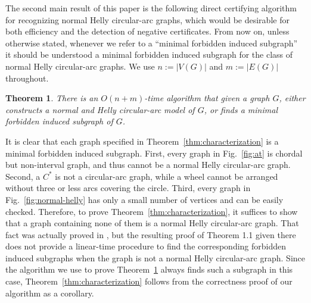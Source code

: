 \documentclass[10pt]{article}
\newtheorem{theorem}{Theorem}[section]
\newcommand{\nhcag}{normal Helly circular-arc graph}
\begin{document}
The second main result of this paper is the following direct
certifying algorithm for recognizing \nhcag s, which would be
desirable for both efficiency and the detection of negative
certificates.  From now on, unless otherwise stated, whenever we refer
to a ``minimal forbidden induced subgraph'' it should be understood a
minimal forbidden induced subgraph for the class of normal Helly
circular-arc graphs.  We use $n := |V(G)|$ and $m := |E(G)|$
throughout.
\begin{theorem}\label{thm:certifying-algorithm}
  There is an $O(n+m)$-time algorithm that given a graph $G$, either
  constructs a normal and Helly circular-arc model of $G$, or finds a
  minimal forbidden induced subgraph of $G$.
\end{theorem}

It is clear that each graph specified in
Theorem~\ref{thm:characterization} is a minimal forbidden induced
subgraph.  First, every graph in Fig.~\ref{fig:at} is chordal but
non-interval graph, and thus cannot be a \nhcag.  Second, a $C^*$ is
not a circular-arc graph, while a wheel cannot be arranged without
three or less arcs covering the circle.  Third, every graph in
Fig.~\ref{fig:normal-helly} has only a small number of vertices and
can be easily checked.  Therefore, to prove
Theorem~\ref{thm:characterization}, it suffices to show that a graph
containing none of them is a \nhcag.  That fact was actually proved in
\cite{grippo-12-cag-without-dominating-triple}, but the resulting
proof of Theorem 1.1 given there does not provide a linear-time
procedure to find the corresponding forbidden induced subgraphs when
the graph is not a normal Helly circular-arc graph.  Since the
algorithm we use to prove Theorem~\ref{thm:certifying-algorithm}
always finds such a subgraph in this case,
Theorem~\ref{thm:characterization} follows from the correctness proof
of our algorithm as a corollary.
\end{document}
